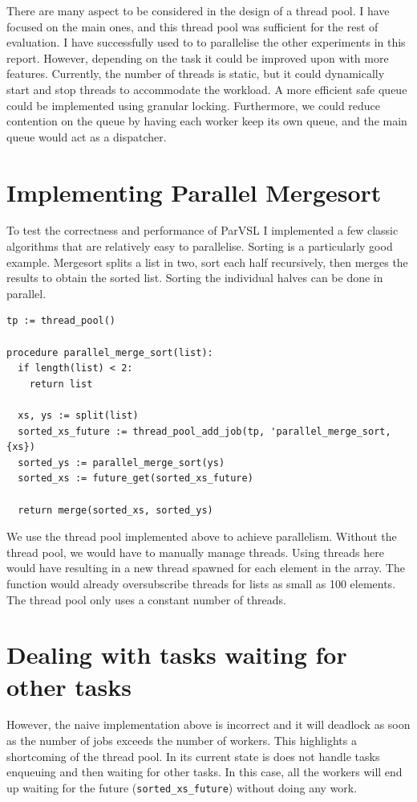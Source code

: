 There are many aspect to be considered in the design of a thread pool. I have focused on the main ones, and
this thread pool was sufficient for the rest of evaluation. I have successfully used to to parallelise the
other experiments in this report. However, depending on the task it could be improved upon with more features.
Currently, the number of threads is static, but it could dynamically start and stop threads to accommodate
the workload. A more efficient safe queue could be implemented using granular locking. Furthermore, we could
reduce contention on the queue by having each worker keep its own queue, and the main queue would act as a
dispatcher.

\section{Implementing Parallel Mergesort}

To test the correctness and performance of ParVSL I implemented a few classic algorithms that are relatively
easy to parallelise. Sorting is a particularly good example. Mergesort splits a list in two, sort each half
recursively, then merges the results to obtain the sorted list. Sorting the individual halves can be done
in parallel.

\begin{verbatim}
tp := thread_pool()

procedure parallel_merge_sort(list):
  if length(list) < 2:
    return list

  xs, ys := split(list)
  sorted_xs_future := thread_pool_add_job(tp, 'parallel_merge_sort, {xs})
  sorted_ys := parallel_merge_sort(ys)
  sorted_xs := future_get(sorted_xs_future)

  return merge(sorted_xs, sorted_ys)
\end{verbatim}

We use the thread pool implemented above to achieve parallelism. Without the thread pool, we would
have to manually manage threads. Using threads here would have resulting in a new thread spawned for
each element in the array. The function would already oversubscribe threads for lists as small as
100 elements. The thread pool only uses a constant number of threads.

\section{Dealing with tasks waiting for other tasks}

However, the naive implementation above is incorrect and it will deadlock as soon as the number of
jobs exceeds the number of workers. This highlights a shortcoming of the thread pool. In its current
state is does not handle tasks enqueuing and then waiting for other tasks. In this case, all the workers
will end up waiting for the future (\texttt{sorted\_xs\_future}) without doing any work.

